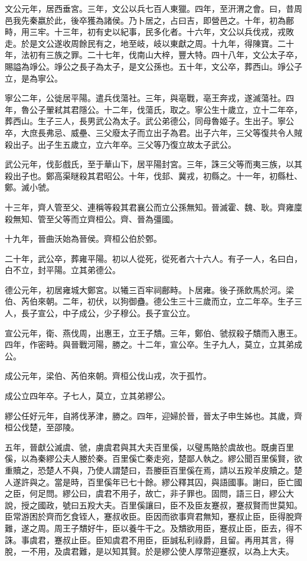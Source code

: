 文公元年，居西垂宮。三年，文公以兵七百人東獵。四年，至汧渭之會。曰，昔周邑我先秦嬴於此，後卒獲為諸侯。乃卜居之，占曰吉，即營邑之。十年，初為鄜畤，用三牢。十三年，初有史以紀事，民多化者。十六年，文公以兵伐戎，戎敗走。於是文公遂收周餘民有之，地至岐，岐以東獻之周。十九年，得陳寶。二十年，法初有三族之罪。二十七年，伐南山大梓，豐大特。四十八年，文公太子卒，賜謚為竫公。竫公之長子為太子，是文公孫也。五十年，文公卒，葬西山。竫公子立，是為寧公。

寧公二年，公徙居平陽。遣兵伐蕩社。三年，與亳戰，亳王奔戎，遂滅蕩社。四年，魯公子翬弒其君隱公。十二年，伐蕩氏，取之。寧公生十歲立，立十二年卒，葬西山。生子三人，長男武公為太子。武公弟德公，同母魯姬子。生出子。寧公卒，大庶長弗忌、威壘、三父廢太子而立出子為君。出子六年，三父等復共令人賊殺出子。出子生五歲立，立六年卒。三父等乃復立故太子武公。

武公元年，伐彭戲氏，至于華山下，居平陽封宮。三年，誅三父等而夷三族，以其殺出子也。鄭高渠瞇殺其君昭公。十年，伐邽、冀戎，初縣之。十一年，初縣杜、鄭。滅小虢。

十三年，齊人管至父、連稱等殺其君襄公而立公孫無知。晉滅霍、魏、耿。齊雍廩殺無知、管至父等而立齊桓公。齊、晉為彊國。

十九年，晉曲沃始為晉侯。齊桓公伯於鄄。

二十年，武公卒，葬雍平陽。初以人從死，從死者六十六人。有子一人，名曰白，白不立，封平陽。立其弟德公。

德公元年，初居雍城大鄭宮。以犧三百牢祠鄜畤。卜居雍。後子孫飲馬於河。梁伯、芮伯來朝。二年，初伏，以狗御蠱。德公生三十三歲而立，立二年卒。生子三人，長子宣公，中子成公，少子穆公。長子宣公立。

宣公元年，衛、燕伐周，出惠王，立王子穨。三年，鄭伯、虢叔殺子穨而入惠王。四年，作密畤。與晉戰河陽，勝之。十二年，宣公卒。生子九人，莫立，立其弟成公。

成公元年，梁伯、芮伯來朝。齊桓公伐山戎，次于孤竹。

成公立四年卒。子七人，莫立，立其弟繆公。

繆公任好元年，自將伐茅津，勝之。四年，迎婦於晉，晉太子申生姊也。其歲，齊桓公伐楚，至邵陵。

五年，晉獻公滅虞、虢，虜虞君與其大夫百里傒，以璧馬賂於虞故也。既虜百里傒，以為秦繆公夫人媵於秦。百里傒亡秦走宛，楚鄙人執之。繆公聞百里傒賢，欲重贖之，恐楚人不與，乃使人謂楚曰，吾媵臣百里傒在焉，請以五羖羊皮贖之。楚人遂許與之。當是時，百里傒年已七十餘。繆公釋其囚，與語國事。謝曰，臣亡國之臣，何足問。繆公曰，虞君不用子，故亡，非子罪也。固問，語三日，繆公大說，授之國政，號曰五羖大夫。百里傒讓曰，臣不及臣友蹇叔，蹇叔賢而世莫知。臣常游困於齊而乞食铚人，蹇叔收臣。臣因而欲事齊君無知，蹇叔止臣，臣得脫齊難，遂之周。周王子穨好牛，臣以養牛干之。及穨欲用臣，蹇叔止臣，臣去，得不誅。事虞君，蹇叔止臣。臣知虞君不用臣，臣誠私利祿爵，且留。再用其言，得脫，一不用，及虞君難，是以知其賢。於是繆公使人厚幣迎蹇叔，以為上大夫。

